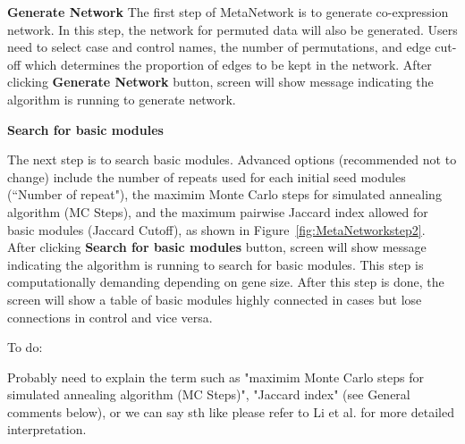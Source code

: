 \begin{steps}
\item \textbf{Generate Network}
The first step of MetaNetwork is to generate co-expression network. 
In this step, the network for permuted data will also be generated. 
Users need to select case and control names, the number of permutations, and edge cut-off which determines the proportion of edges to be kept in the network. 
After clicking \textbf{Generate Network} button, screen will show message indicating the algorithm is running to generate network.


\item \textbf{Search for basic modules}

The next step is to search basic modules.
Advanced options (recommended not to change) include the number of repeats used for each initial seed modules (``Number of repeat"),
the maximim Monte Carlo steps for simulated annealing algorithm (MC Steps),
and the maximum pairwise Jaccard index allowed for basic modules (Jaccard Cutoff), as shown in Figure~\ref{fig:MetaNetworkstep2}.
After clicking \textbf{Search for basic modules} button, screen will show message indicating the algorithm is running to search for basic modules.
This step is computationally demanding depending on gene size.
After this step is done,
the screen will show a table of basic modules highly connected in cases but lose connections in control and vice versa.

{\color{red}
To do:

Probably need to explain the term such as "maximim Monte Carlo
steps for simulated annealing algorithm (MC Steps)", "Jaccard index" (see General comments below), or we can say sth like please refer to Li et al. for more detailed interpretation.
}



\end{steps}
